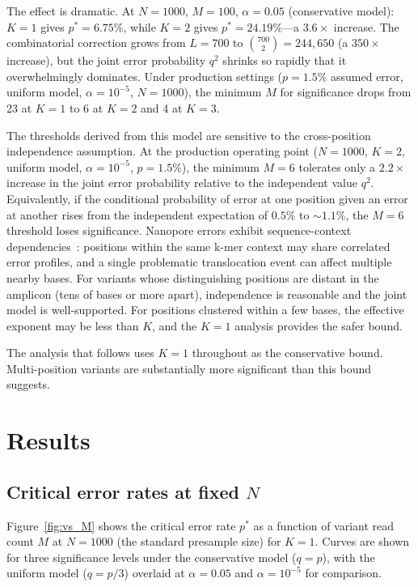 \documentclass[11pt]{article}
\begin{document}
The effect is dramatic. At $N = 1000$, $M = 100$, $\alpha = 0.05$ (conservative
model): $K = 1$ gives $p^* = 6.75\%$, while $K = 2$ gives $p^* = 24.19\%$---a
$3.6{\times}$ increase. The combinatorial correction grows from $L = 700$ to
$\binom{700}{2} = 244{,}650$ (a $350{\times}$ increase), but the joint error
probability $q^2$ shrinks so rapidly that it overwhelmingly dominates. Under
production settings ($p = 1.5\%$ assumed error, uniform model, $\alpha = 10^{-5}$,
$N = 1000$), the minimum $M$ for significance drops from 23 at $K = 1$ to 6 at
$K = 2$ and 4 at $K = 3$.

The thresholds derived from this model are sensitive to the cross-position
independence assumption. At the production operating point ($N = 1000$, $K = 2$,
uniform model, $\alpha = 10^{-5}$, $p = 1.5\%$), the minimum $M = 6$ tolerates
only a $2.2{\times}$ increase in the joint error probability relative to the
independent value $q^2$. Equivalently, if the conditional probability of error at
one position given an error at another rises from the independent expectation of
$0.5\%$ to ${\sim}1.1\%$, the $M = 6$ threshold loses significance.
Nanopore errors exhibit sequence-context dependencies~\cite{delahaye2021}:
positions within the same k-mer context may share correlated error profiles, and
a single problematic translocation event can affect multiple nearby bases.
For variants whose distinguishing positions are distant in the amplicon (tens of
bases or more apart), independence is reasonable and the joint model is
well-supported. For positions clustered within a few bases, the effective
exponent may be less than $K$, and the $K = 1$ analysis provides the safer bound.

The analysis that follows uses $K = 1$ throughout as the conservative bound.
Multi-position variants are substantially more significant than this bound
suggests.

\section{Results}

\subsection{Critical error rates at fixed $N$}

Figure~\ref{fig:vs_M} shows the critical error rate $p^*$ as a function of
variant read count $M$ at $N = 1000$ (the standard presample size) for $K = 1$.
Curves are shown for three significance levels under the conservative model
($q = p$), with the uniform model ($q = p/3$) overlaid at $\alpha = 0.05$ and
$\alpha = 10^{-5}$ for comparison.
\end{document}
